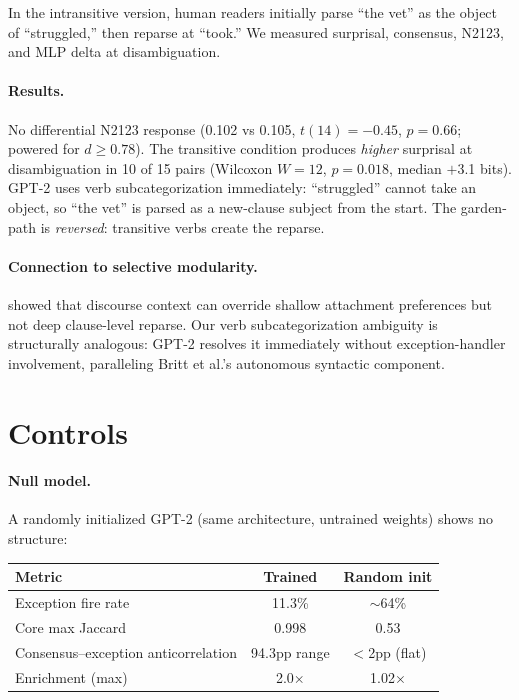 \documentclass{article}
\begin{document}
In the intransitive version, human readers initially parse ``the vet'' as
the object of ``struggled,'' then reparse at ``took.''
We measured surprisal, consensus, N2123, and MLP delta at disambiguation.

\paragraph{Results.}
No differential N2123 response (0.102 vs 0.105, $t(14) = -0.45$, $p = 0.66$;
powered for $d \geq 0.78$).
The transitive condition produces \emph{higher} surprisal at disambiguation
in 10 of 15 pairs (Wilcoxon $W = 12$, $p = 0.018$, median $+$3.1 bits).
GPT-2 uses verb subcategorization immediately: ``struggled'' cannot take an
object, so ``the vet'' is parsed as a new-clause subject from the start.
The garden-path is \emph{reversed}: transitive verbs create the reparse.

\paragraph{Connection to selective modularity.}
\citet{britt1992parsing} showed that discourse context can override shallow
attachment preferences but not deep clause-level reparse. Our verb
subcategorization ambiguity is structurally analogous: GPT-2 resolves it
immediately without exception-handler involvement, paralleling Britt et al.'s
autonomous syntactic component.

\section{Controls}
\label{app:controls}

\paragraph{Null model.}
A randomly initialized GPT-2 (same architecture, untrained weights) shows
no structure:

\begin{center}
\small
\begin{tabular}{@{}lcc@{}}
\toprule
Metric & Trained & Random init \\
\midrule
Exception fire rate & 11.3\% & $\sim$64\% \\
Core max Jaccard    & 0.998  & 0.53 \\
Consensus--exception anticorrelation & 94.3pp range & $<$2pp (flat) \\
Enrichment (max)    & 2.0$\times$ & 1.02$\times$ \\
\bottomrule
\end{tabular}
\end{center}
\end{document}
